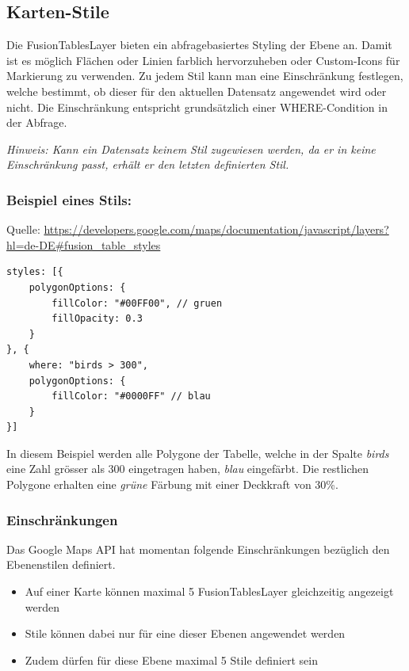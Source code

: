 \subsection{Karten-Stile}
Die FusionTablesLayer bieten ein abfragebasiertes Styling der Ebene an. Damit ist es möglich Flächen oder Linien farblich hervorzuheben oder Custom-Icons für Markierung zu verwenden. Zu jedem Stil kann man eine Einschränkung festlegen, welche bestimmt, ob dieser für den aktuellen Datensatz angewendet wird oder nicht. Die Einschränkung entspricht grundsätzlich einer WHERE-Condition in der Abfrage.

\emph{Hinweis: Kann ein Datensatz keinem Stil zugewiesen werden, da er in keine Einschränkung passt, erhält er den letzten definierten Stil.}

\subsubsection{Beispiel eines Stils:}
Quelle: \url{https://developers.google.com/maps/documentation/javascript/layers?hl=de-DE#fusion_table_styles}

\lstset{language=JavaScript}
\begin{lstlisting}
styles: [{
	polygonOptions: {
		fillColor: "#00FF00", // gruen
		fillOpacity: 0.3
	}
}, {
	where: "birds > 300",
	polygonOptions: {
		fillColor: "#0000FF" // blau
	}
}]
\end{lstlisting}

In diesem Beispiel werden alle Polygone der Tabelle, welche in der Spalte \emph{birds} eine Zahl grösser als 300 eingetragen haben, \emph{blau} eingefärbt. Die restlichen Polygone erhalten eine \emph{grüne} Färbung mit einer Deckkraft von 30\%.

\subsubsection{Einschränkungen}
\label{fusiontableslayer-styles-restrictions}
Das Google Maps API hat momentan folgende Einschränkungen bezüglich den Ebenenstilen definiert.

\begin{itemize}
\item Auf einer Karte können maximal 5 FusionTablesLayer gleichzeitig angezeigt werden
\item Stile können dabei nur für eine dieser Ebenen angewendet werden
\item Zudem dürfen für diese Ebene maximal 5 Stile definiert sein
\end{itemize}


